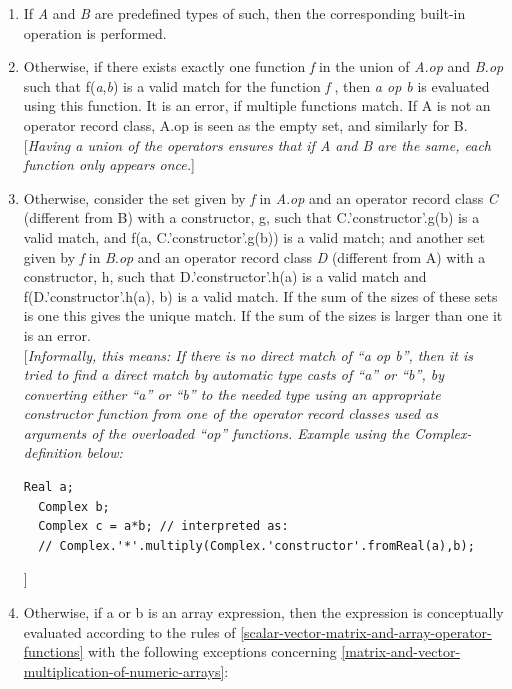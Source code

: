 \documentclass[10pt,a4paper]{report}
\begin{document}
\begin{enumerate}
\item
  If \emph{A} and \emph{B} are predefined types of such, then the
  corresponding built-in operation is performed.
\item
  Otherwise, if there exists {exactly one} function \emph{f} in the
  union of \emph{A}.\emph{op} and \emph{B.op} such that
  f(\emph{a},\emph{b}) is a valid match for the function \emph{f} , then
  \emph{a op b} is evaluated using this function. It is an error, if
  multiple functions match. If A is not an operator record class, A.op
  is seen as the empty set, and similarly for B. {[}\emph{Having a union
  of the operators ensures that if A and B are the same, each function
  only appears once.}{]}
\item
  Otherwise, consider the set given by \emph{f} in \emph{A}.\emph{op}
  and an operator record class \emph{C} (different from B) with a
  constructor, g, such that C.'constructor'.g(b) is a valid match, and
  f(a, C.'constructor'.g(b)) is a valid match; and another set given by
  \emph{f} in \emph{B}.\emph{op} and an operator record class \emph{D}
  (different from A) with a constructor, h, such that
  D.'constructor'.h(a) is a valid match and f(D.'constructor'.h(a), b)
  is a valid match. If the sum of the sizes of these sets is one this
  gives the unique match. If the sum of the sizes is larger than one it
  is an error.\\
  {[}\emph{Informally, this means: If there is no direct match of ``a op
  b'', then it is tried to find a direct match by automatic type casts
  of ``a'' or ``b'', by converting either ``a'' or ``b'' to the needed
  type using an appropriate constructor function from one of the
  operator record classes used as arguments of the overloaded ``op''
  functions. Example using the Complex-definition below:\\
  }
\begin{lstlisting}[language=modelica]
   Real a;
  Complex b;
  Complex c = a*b; // interpreted as:
  // Complex.'*'.multiply(Complex.'constructor'.fromReal(a),b);
\end{lstlisting}
{]}
\item
  Otherwise, if a or b is an {array expression}, then the expression is
  conceptually evaluated according to the rules of \ref{scalar-vector-matrix-and-array-operator-functions} with the
  following exceptions concerning \ref{matrix-and-vector-multiplication-of-numeric-arrays}:


\end{enumerate}
\end{document}
